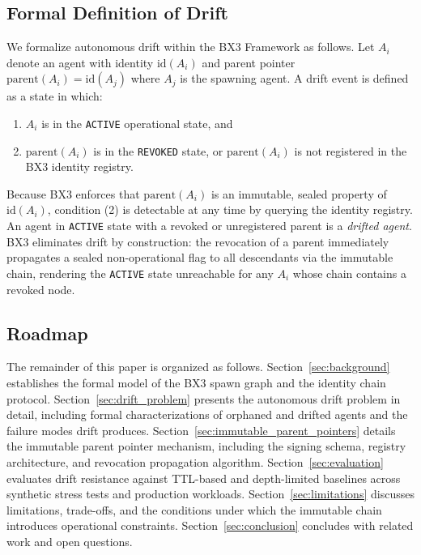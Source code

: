 \subsection{Formal Definition of Drift}

We formalize autonomous drift within the BX3 Framework as follows. Let $A_i$ denote an agent with identity $\mathrm{id}(A_i)$ and parent pointer $\mathrm{parent}(A_i) = \mathrm{id}(A_j)$ where $A_j$ is the spawning agent. A drift event is defined as a state in which:

\begin{enumerate}
    \item $A_i$ is in the \texttt{ACTIVE} operational state, and
    \item $\mathrm{parent}(A_i)$ is in the \texttt{REVOKED} state, or $\mathrm{parent}(A_i)$ is not registered in the BX3 identity registry.
\end{enumerate}

Because BX3 enforces that $\mathrm{parent}(A_i)$ is an immutable, sealed property of $\mathrm{id}(A_i)$, condition (2) is detectable at any time by querying the identity registry. An agent in \texttt{ACTIVE} state with a revoked or unregistered parent is a \emph{drifted agent}. BX3 eliminates drift by construction: the revocation of a parent immediately propagates a sealed non-operational flag to all descendants via the immutable chain, rendering the \texttt{ACTIVE} state unreachable for any $A_i$ whose chain contains a revoked node.

\subsection{Roadmap}

The remainder of this paper is organized as follows. Section~\ref{sec:background} establishes the formal model of the BX3 spawn graph and the identity chain protocol. Section~\ref{sec:drift_problem} presents the autonomous drift problem in detail, including formal characterizations of orphaned and drifted agents and the failure modes drift produces. Section~\ref{sec:immutable_parent_pointers} details the immutable parent pointer mechanism, including the signing schema, registry architecture, and revocation propagation algorithm. Section~\ref{sec:evaluation} evaluates drift resistance against TTL-based and depth-limited baselines across synthetic stress tests and production workloads. Section~\ref{sec:limitations} discusses limitations, trade-offs, and the conditions under which the immutable chain introduces operational constraints. Section~\ref{sec:conclusion} concludes with related work and open questions.